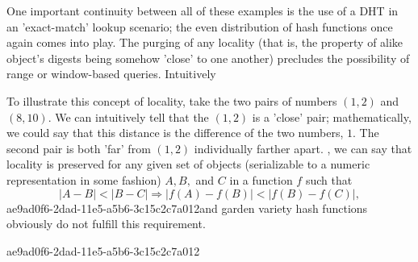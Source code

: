 \documentclass[12pt]{article}
\begin{document}
\par One important continuity between all of these examples is the use of a DHT in an 'exact-match' lookup scenario; the even distribution of hash functions once again comes into play. The purging of any locality (that is, the property of alike object's digests being somehow 'close' to one another) precludes the possibility of range or window-based queries. Intuitively

\par To illustrate this concept of locality, take the two pairs of numbers $(1,2)$ and $(8,10)$. We can intuitively tell that the $(1,2)$ is a 'close' pair; mathematically, we could say that this distance is the difference of the two numbers, $1$. The second pair is both 'far' from $(1,2)$ individually farther apart. , we can say that locality is preserved for any given set of objects (serializable to a numeric representation in some fashion) $A,B,$ and $C$ in a function $f$ such that
\begin{equation}
|A-B| < |B-C| \Rightarrow |f(A)-f(B)| < |f(B) - f(C)|,
\end{equation}
ae9ad0f6-2dad-11e5-a5b6-3c15c2c7a012and garden variety hash functions obviously do not fulfill this requirement.

\printbibliography
ae9ad0f6-2dad-11e5-a5b6-3c15c2c7a012
\end{document}
